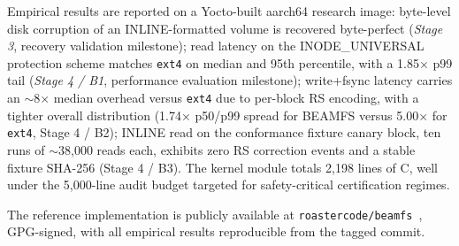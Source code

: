 Empirical results are reported on a Yocto-built aarch64 research
image: byte-level disk corruption of an INLINE-formatted volume is
recovered byte-perfect (\emph{Stage 3}, recovery validation
milestone); read latency on the
INODE\_UNIVERSAL protection scheme matches \texttt{ext4} on median
and 95th percentile, with a 1.85\(\times\) p99 tail (\emph{Stage 4 / B1}, performance
evaluation milestone); write+fsync latency carries an
\(\sim\)8\(\times\) median
overhead versus \texttt{ext4} due to per-block RS encoding, with a
tighter overall distribution (1.74\(\times\) p50/p99 spread for
BEAMFS versus 5.00\(\times\) for \texttt{ext4}, Stage 4 / B2);
INLINE read on the conformance fixture canary block, ten runs of
\(\sim\)38{,}000 reads each, exhibits zero RS correction events
and a stable fixture SHA-256 (Stage 4 / B3). The kernel module
totals 2{,}198 lines of C, well under the 5{,}000-line audit
budget targeted for safety-critical certification regimes.

The reference implementation is publicly available at
\texttt{roastercode/beamfs}~\cite{beamfs-impl}, GPG-signed, with
all empirical results reproducible from the tagged commit.
